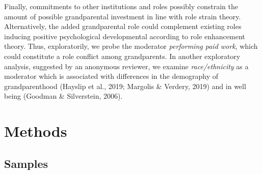\documentclass[
  english,
  man,floatsintext]{apa7}
\begin{document}
Finally, commitments to other institutions and roles possibly constrain the amount of possible grandparental investment in line with role strain theory. Alternatively, the added grandparental role could complement existing roles inducing positive psychological developmental according to role enhancement theory. Thus, exploratorily, we probe the moderator \emph{performing paid work}, which could constitute a role conflict among grandparents. In another exploratory analysis, suggested by an anonymous reviewer, we examine \emph{race/ethnicity} as a moderator which is associated with differences in the demography of grandparenthood (Hayslip et al., 2019; Margolis \& Verdery, 2019) and in well being (Goodman \& Silverstein, 2006).

\hypertarget{methods}{%
\section{Methods}\label{methods}}

\hypertarget{samples}{%
\subsection{Samples}\label{samples}}
\end{document}
